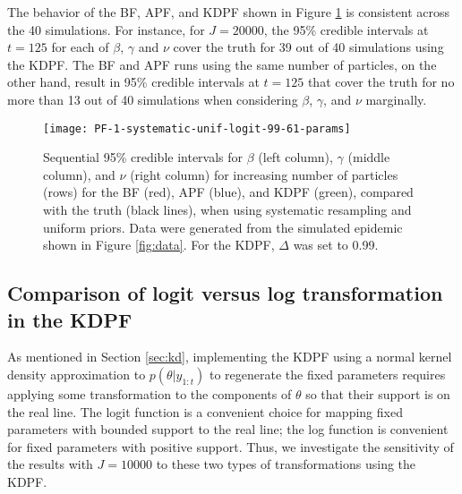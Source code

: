 \documentclass{elsarticle}
\newcommand{\danny}[1]{{\color{blue} DANNY: #1}}
\begin{document}

The behavior of the BF, APF, and KDPF shown in Figure \ref{fig:pfs} is consistent across the 40 simulations. For instance, for $J = 20000$, the 95\% credible intervals at $t = 125$ for each of $\beta$, $\gamma$ and $\nu$ cover the truth for 39 out of 40 simulations using the KDPF. The BF and APF runs using the same number of particles, on the other hand, result in 95\% credible intervals at $t = 125$ that cover the truth for no more than 13 out of 40 simulations when considering $\beta$, $\gamma$, and $\nu$ marginally.

\begin{figure}
\centering
\texttt{[image: PF-1-systematic-unif-logit-99-61-params]}
\caption{Sequential 95\% credible intervals for $\beta$ (left column), $\gamma$ (middle column), and $\nu$ (right column) for increasing number of particles (rows) for the BF (red), APF (blue), and KDPF (green), compared with the truth (black lines), when using systematic resampling and uniform priors. Data were generated from the simulated epidemic shown in Figure \ref{fig:data}. For the KDPF, $\Delta$ was set to 0.99. } \label{fig:pfs}
\end{figure}

\subsection{Comparison of logit versus log transformation in the KDPF \label{sec:priors}}

As mentioned in Section \ref{sec:kd}, implementing the KDPF using a normal kernel density approximation to $p(\theta|y_{1:t})$ to regenerate the fixed parameters requires applying some transformation to the components of $\theta$ so that their support is on the real line. The logit function is a convenient choice for mapping fixed parameters with bounded support to the real line; the log function is convenient for fixed parameters with positive support. Thus, we investigate the sensitivity of the results with $J = 10000$ to these two types of transformations using the KDPF.
\end{document}

